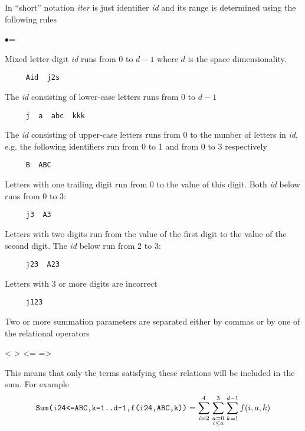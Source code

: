 \documentclass[twoside,openright]{report}
\newcommand{\grgtt}{\ttfamily}
\renewcommand{\tt}{\grgtt}
\newcommand{\parm}[1]{{\sf\slshape#1\/}}  %
\begin{document}
In ``short'' notation \parm{iter} is just identifier \label{siter}
\parm{id} and its range is determined using
the following rules
\begin{list}{$\bullet$}{\leftmargin=\parindent}
\item Mixed letter-digit \parm{id} runs from 0 to $d-1$
      where $d$ is the space dimensionality.
\begin{verbatim}
     Aid  j2s
\end{verbatim}
\item The \parm{id} consisting of lower-case letters runs from
      $0$ to $d-1$
\begin{verbatim}
     j  a  abc  kkk
\end{verbatim}
\item The \parm{id} consisting of upper-case letters runs from
      $0$ to the number of letters in \parm{id}, e.g. the following
      identifiers run from 0 to 1 and from 0 to 3 respectively
\begin{verbatim}
     B  ABC
\end{verbatim}
\item Letters with one trailing digit run from 0 to the value
      of this digit. Both \parm{id} below runs from 0 to 3:
\begin{verbatim}
     j3  A3
\end{verbatim}
\item Letters with two digits run from the value of the
      first digit to the value of the second digit. The \parm{id} below
      run from 2 to 3:
\begin{verbatim}
     j23  A23
\end{verbatim}
\item Letters with 3 or more digits are incorrect
\begin{verbatim}
     j123
\end{verbatim}
\end{list}

Two or more summation parameters are separated either
by commas or by  one of the relational operators
\begin{listing}
    <   >   <=   =>
\end{listing}
This means that only the terms satisfying these relations
will be included in the sum. For example
\[
\mbox{\tt Sum(i24<=ABC,k=1..d-1,f(i24,ABC,k))} =
\sum_{i=2}^{4} \sum_{\scriptstyle a=0\atop\scriptstyle i\leq a}^{3} \sum^{d-1}_{k=1} f(i,a,k)
\]

\enlargethispage{5mm}
\end{document}
